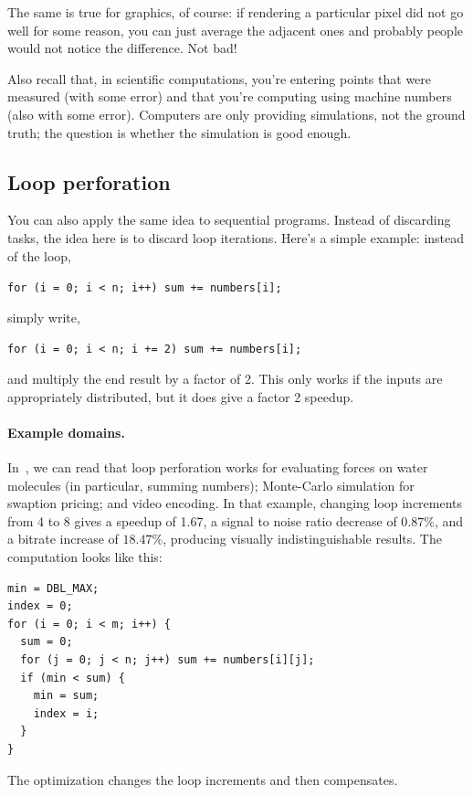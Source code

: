 \documentclass[a4paper]{report}
\begin{document}
The same is true for graphics, of course: if rendering a particular pixel did
not go well for some reason, you can just average the adjacent ones and probably
people would not notice the difference. Not bad!

Also recall that, in scientific computations, you're entering points
that were measured (with some error) and that you're computing
using machine numbers (also with some error). Computers are only
providing simulations, not the ground truth; the question is
whether the simulation is good enough.

\subsection*{Loop perforation} 
You can also apply the same idea to sequential programs. Instead
of discarding tasks, the idea here is to discard loop iterations.
Here's a simple example: instead of the loop,
\begin{center}
\verb|for (i = 0; i < n; i++) sum += numbers[i];|
\end{center} \vspace*{-1em}
simply write,
\vspace*{-1em}\begin{center}
\verb|for (i = 0; i < n; i += 2) sum += numbers[i];|
\end{center}
and multiply the end result by a factor of 2. This only works 
if the inputs are appropriately distributed, but it does give a
factor 2 speedup.

\paragraph{Example domains.} In~\cite{Rinard:2010:PSA:1932682.1869525},
we can read that loop perforation works for evaluating forces on water
molecules (in particular, summing numbers); Monte-Carlo simulation for
swaption pricing; and video encoding. In that example, changing loop
increments from 4 to 8 gives a speedup of 1.67, a signal to noise ratio
decrease of $0.87\%$, and a bitrate increase of $18.47\%$, producing
visually indistinguishable results. The computation looks like this:

{\small
\begin{verbatim}
min = DBL_MAX;
index = 0;
for (i = 0; i < m; i++) {
  sum = 0;
  for (j = 0; j < n; j++) sum += numbers[i][j];
  if (min < sum) {
    min = sum;
    index = i;
  }
}
\end{verbatim}
}
The optimization changes the loop increments and then compensates. 
\end{document}
